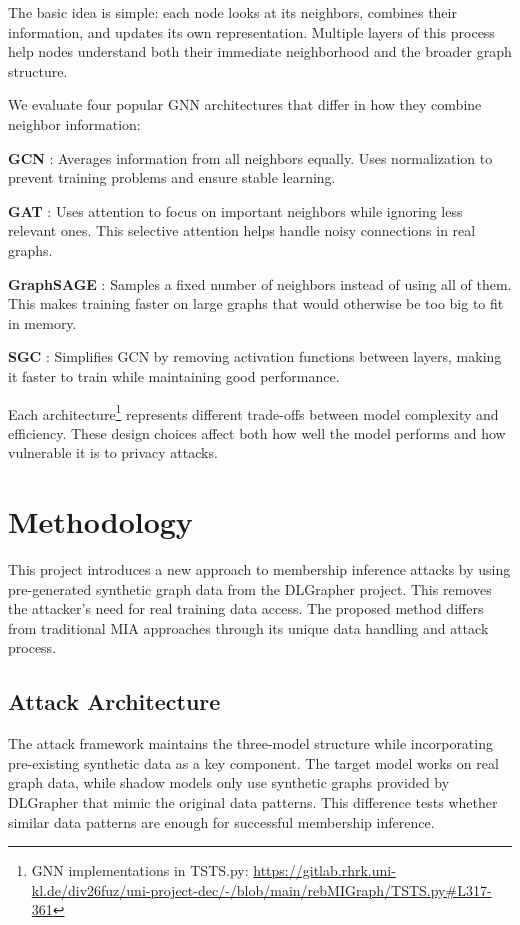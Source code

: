 \documentclass{article}
\begin{document}
The basic idea is simple: each node looks at its neighbors, combines their information, and updates its own representation. Multiple layers of this process help nodes understand both their immediate neighborhood and the broader graph structure.

We evaluate four popular GNN architectures that differ in how they combine neighbor information:

\textbf{GCN} \cite{kipf2017semi}: Averages information from all neighbors equally. Uses normalization to prevent training problems and ensure stable learning.

\textbf{GAT} \cite{velickovic2018graph}: Uses attention to focus on important neighbors while ignoring less relevant ones. This selective attention helps handle noisy connections in real graphs.

\textbf{GraphSAGE} \cite{hamilton2017inductive}: Samples a fixed number of neighbors instead of using all of them. This makes training faster on large graphs that would otherwise be too big to fit in memory.

\textbf{SGC} \cite{wu2019simplifying}: Simplifies GCN by removing activation functions between layers, making it faster to train while maintaining good performance.

Each architecture\footnote{GNN implementations in TSTS.py: \url{https://gitlab.rhrk.uni-kl.de/div26fuz/uni-project-dec/-/blob/main/rebMIGraph/TSTS.py\#L317-361}} represents different trade-offs between model complexity and efficiency. These design choices affect both how well the model performs and how vulnerable it is to privacy attacks.

\section{Methodology}
This project introduces a new approach to membership inference attacks by using pre-generated synthetic graph data from the DLGrapher project. This removes the attacker's need for real training data access. The proposed method differs from traditional MIA approaches through its unique data handling and attack process.

\subsection{Attack Architecture}
The attack framework maintains the three-model structure while incorporating pre-existing synthetic data as a key component. The target model works on real graph data, while shadow models only use synthetic graphs provided by DLGrapher that mimic the original data patterns. This difference tests whether similar data patterns are enough for successful membership inference.
\end{document}
